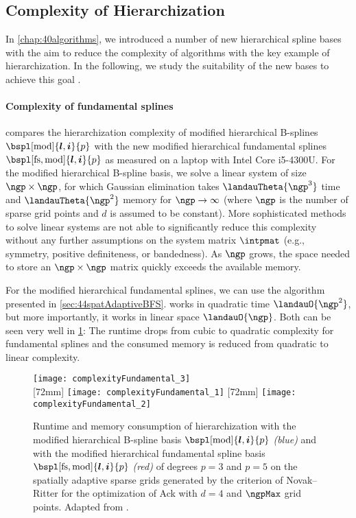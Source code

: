 \subsection{Complexity of Hierarchization}
\label{sec:543complexity}

In \cref{chap:40algorithms}, we introduced a number of new
hierarchical spline bases with the aim to reduce the complexity
of algorithms with the key example of hierarchization.
In the following, we study the suitability of the new bases
to achieve this goal \cite{Valentin18Fundamental}.

\paragraph{Complexity of fundamental splines}

 compares the hierarchization complexity of
modified hierarchical B-splines $\bspl[\modified]{\*l,\*i}{p}$ with the new
modified hierarchical fundamental splines $\bspl[\fs,\modified]{\*l,\*i}{p}$
as measured on a laptop with Intel Core i5-4300U.
For the modified hierarchical B-spline basis,
we solve a linear system of size $\ngp \times \ngp$,
for which Gaussian elimination takes
$\landauTheta{\ngp^3}$ time and $\landauTheta{\ngp^2}$ memory for
$\ngp \to \infty$ (where $\ngp$ is the number of sparse grid points and
$d$ is assumed to be constant).
More sophisticated methods to solve linear systems
are not able to significantly
reduce this complexity without any further assumptions on the system matrix
$\intpmat$ (e.g., symmetry, positive definiteness, or bandedness).
As $\ngp$ grows,
the space needed to store an $\ngp \times \ngp$ matrix quickly exceeds
the available memory.

For the modified hierarchical fundamental splines,
we can use the \bfs algorithm presented in \cref{sec:44spatAdaptiveBFS}.
\bfs works in quadratic time $\landauO{\ngp^2}$, but more importantly,
it works in linear space $\landauO{\ngp}$.
Both can be seen very well in \cref{fig:complexityFundamental}:
The runtime drops from cubic to quadratic complexity for fundamental splines
and the consumed memory is reduced from quadratic to linear complexity.

\begin{figure}
  \texttt{[image: complexityFundamental\_3]}\\[2mm]%
  [72mm]{%
    \texttt{[image: complexityFundamental\_1]}%
  }%
  \hfill%
  [72mm]{%
    \texttt{[image: complexityFundamental\_2]}%
  }%
  \caption[Complexity of fundamental splines]{%
    Runtime and memory consumption of hierarchization
    with the modified hierarchical B-spline basis
    $\bspl[\modified]{\*l,\*i}{p}$ \emph{\textcolor{C0}{(blue)}} and
    with the modified hierarchical fundamental spline basis
    $\bspl[\fs,\modified]{\*l,\*i}{p}$ \emph{\textcolor{C1}{(red)}}
    of degrees $p = 3$ and $p = 5$
    on the spatially adaptive sparse grids generated by the criterion of
    Novak--Ritter for the optimization of Ack with $d = 4$ and
    $\ngpMax$ grid points.
    Adapted from \cite{Valentin18Fundamental}.%
  }%
  \label{fig:complexityFundamental}%
\end{figure}

